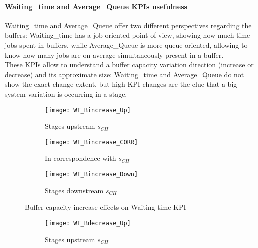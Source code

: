 \paragraph{Waiting\_time and Average\_Queue KPIs usefulness}
Waiting\_time and Average\_Queue offer two different perspectives regarding the buffers: Waiting\_time has a job-oriented point of view, showing how much time jobs spent in buffers, while Average\_Queue is more queue-oriented, allowing to know how many jobs are on average simultaneously present in a buffer.\\
These KPIs allow to understand a buffer capacity variation direction (increase or decrease) and its approximate size: Waiting\_time and Average\_Queue do not show the exact change extent, but high KPI changes are the clue that a big system variation is occurring in a stage.
\begin{landscape}
\begin{figure}[p]
  \centering
  \begin{subfigure}[t]{0.4\textwidth}
    \texttt{[image: WT\_Bincrease\_Up]}
    \caption{Stages upstream $s_{CH}$}
    \label{fig:Buffer capacity increase effects on Waiting time KPI - Stages upstream}   
  \end{subfigure}
  \begin{subfigure}[t]{0.4\textwidth}
    \texttt{[image: WT\_Bincrease\_CORR]}
    \caption{In correspondence with $s_{CH}$}
    \label{fig:Buffer capacity increase effects on Waiting time KPI - In correspondence with}   
  \end{subfigure}
  \begin{subfigure}[t]{0.4\textwidth}
    \texttt{[image: WT\_Bincrease\_Down]}
    \caption{Stages downstream $s_{CH}$}
    \label{fig:Buffer capacity increase effects on Waiting time KPI - Stages downstream}   
  \end{subfigure}
  \caption{Buffer capacity increase effects on Waiting time KPI}
  \label{fig:Buffer capacity increase effects on Waiting time KPI}
\end{figure}
\begin{figure}[p]
  \centering
  \begin{subfigure}[b]{0.4\textwidth}
    \texttt{[image: WT\_Bdecrease\_Up]}
    \caption{Stages upstream $s_{CH}$}
    \label{fig:Buffer capacity decrease effects on Waiting time KPI - Stages upstream}   
  \end{subfigure}
  \begin{subfigure}[b]{0.4\textwidth}

\end{subfigure}
\end{figure}
\end{landscape}

